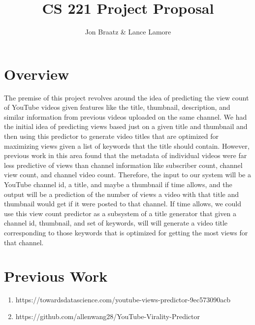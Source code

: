 \documentclass[12pt]{article}
\title{CS 221 Project Proposal}
\author{Jon Braatz \& Lance Lamore}
\theoremstyle{definition}
\theoremstyle{remark}
\begin{document}
\maketitle


\section{Overview}

The premise of this project revolves around the idea of predicting the view
count of YouTube videos given features like the title, thumbnail, description,
and similar information from previous videos uploaded on the same channel. We
had the initial idea of predicting views based just on a given title and
thumbnail and then using this predictor to generate video titles that are
optimized for maximizing views given a list of keywords that the title should
contain. However, previous work in this area found that the metadata of
individual videos were far less predictive of views than channel information
like subscriber count, channel view count, and channel video count. Therefore,
the input to our system will be a YouTube channel id, a title, and maybe a
thumbnail if time allows, and the output will be a prediction of the number of
views a video with that title and thumbnail would get if it were posted to that
channel. If time allows, we could use this view count predictor as a subsystem
of a title generator that given a channel id, thumbnail, and set of keywords,
will will generate a video title corresponding to those keywords that is
optimized for getting the most views for that channel.


\section{Previous Work}
\begin{enumerate}
  \item https://towardsdatascience.com/youtube-views-predictor-9ec573090acb
  \item https://github.com/allenwang28/YouTube-Virality-Predictor 
\end{enumerate}
\end{document}
